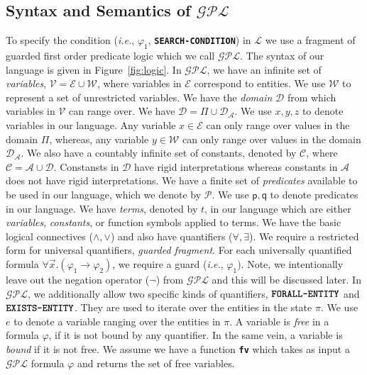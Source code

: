 \documentclass{sig-alternate}
\newcommand{\ie}{\textit{i.e.}\xspace}
\newcommand{\state}{\ensuremath{\pi}\xspace}
\newcommand{\stateset}{\ensuremath{\Pi}\xspace}
\newcommand{\planguage}{\ensuremath{\mathbf{\mathcal{GPL}}}\xspace}
\newcommand{\cD}{\ensuremath{\mathcal{D}}\xspace}
\newcommand{\cA}{\ensuremath{\mathcal{A}}\xspace}
\newcommand{\funcname}[1]{\textbf{\texttt{#1}}}
\newcommand{\policy}{\ensuremath{\varphi}\xspace}
\newcommand{\cL}{\ensuremath{\mathcal{L}}\xspace}
\newcommand{\cP}{\ensuremath{\mathcal{P}}\xspace}
\newcommand{\pred}[1]{\ensuremath{\mathsf{#1}}\xspace}
\newcommand{\foralle}{\ensuremath{\funcname{FORALL-ENTITY}}\xspace}
\newcommand{\existse}{\ensuremath{\funcname{EXISTS-ENTITY}}\xspace}
\newcommand{\cV}{\ensuremath{\mathcal{V}}\xspace}
\newcommand{\cW}{\ensuremath{\mathcal{W}}\xspace}
\newcommand{\cE}{\ensuremath{\mathcal{E}}\xspace}
\newcommand{\cC}{\ensuremath{\mathcal{C}}\xspace}
\begin{document}
\subsection{Syntax and Semantics of \planguage}
\label{sec:condition}
To specify the condition (\ie, $\policy_1$, \funcname{SEARCH-CONDITION}) in \cL we use a fragment of guarded first order predicate logic which we call \planguage. 
The syntax of our language is given in Figure~\ref{fig:logic}. In \planguage, we have an infinite set of \emph{variables}, $\cV = \cE \cup \cW$, 
where variables in $\cE$ correspond to entities. We use \cW to represent 
a set of unrestricted variables. We have the \emph{domain} \cD from which variables in \cV can range over.  
We have $\cD = \stateset\cup \cD_{\cA}$. We use $x, y, z$ to denote variables in our language. Any variable $x\in\cE$  
can only range over values in the domain $\stateset$, whereas, any variable $y\in\cW$ can only range over values in the 
domain $\cD_{\cA}$. 
We also have a countably infinite set of constants, denoted by \cC, where $\cC = \cA\cup \cD$. 
Constansts in \cD have rigid interpretations whereas constants in \cA does not have rigid interpretations. 
We have a  finite set of \emph{predicates} available to be used in our language, which we denote by \cP. We use 
$\pred{p}, \pred{q}$ to denote predicates in our language. We have \emph{terms}, denoted by $t$, in our language which are either 
\emph{variables}, \emph{constants}, or function symbols applied to terms. 
We have the basic logical connectives ($\wedge, \vee$) and also have quantifiers ($\forall, \exists$). 
We require a restricted form for universal quantifiers, \emph{guarded fragment}. For each universally quantified formula $\forall \vec{x}.(\policy_1\rightarrow\policy_2)$, 
we require a guard (\ie, $\policy_1$). Note, we intentionally leave out the negation operator ($\neg$) from \planguage and this will be discussed 
later. In \planguage, we additionally allow two specific kinds of quantifiers, \foralle and \existse. They are used to 
iterate over the entities in the state \state. 
We use $e$ to denote a variable ranging over the entities in \state. 
A variable is \emph{free} in a formula \policy, if it is not bound by any quantifier. 
In the same vein, a variable is \emph{bound} if it is not free. We assume we have a function \funcname{fv} which takes as input 
a \planguage formula \policy and returns the set of free variables. 
\end{document}
